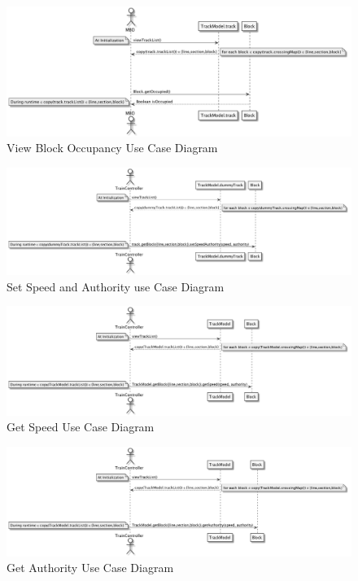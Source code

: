 \documentclass[]{article}
\begin{document}
\begin{figure}[H]
	\centering
	\includegraphics[scale=.3]{viewBlockOccupancy.png}
	\caption{View Block Occupancy Use Case Diagram}
\end{figure}

\begin{figure}[H]
	\centering
	\includegraphics[scale=.3]{setSpeedAuthority.png}
	\caption{Set Speed and Authority use Case Diagram}
\end{figure}

\begin{figure}[H]
	\centering
	\includegraphics[scale=.3]{getSpeed.png}
	\caption{Get Speed Use Case Diagram}
\end{figure}

\begin{figure}[H]
	\centering
	\includegraphics[scale=.3]{getAuthority.png}
	\caption{Get Authority Use Case Diagram}
\end{figure}
\end{document}
